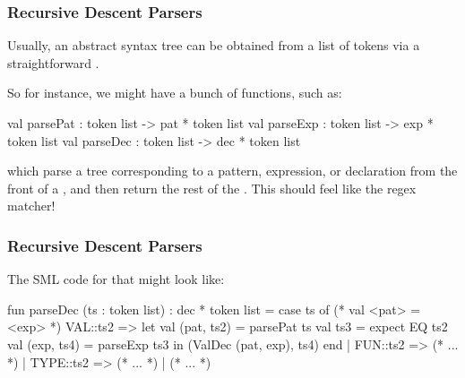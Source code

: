 \documentclass[aspectratio=169, handout]{beamer}
\begin{document}
\begin{frame}[fragile]
  \frametitle{Recursive Descent Parsers}

  \rprs

  Usually, an abstract syntax tree can be obtained from a list of tokens via a
  straightforward .

  \pause
  \vspace{\fill}


  \pause
  \vspace{\fill}

  So for instance, we might have a bunch of functions, such as:
  \begin{codeblock}
    val parsePat : token list -> pat * token list
    val parseExp : token list -> exp * token list
    val parseDec : token list -> dec * token list
  \end{codeblock}

  which parse a tree corresponding to a pattern, expression, or declaration from
  the front of a , and then return the rest of the .
  This should feel like the regex matcher!
\end{frame}

\begin{frame}[fragile]
  \frametitle{Recursive Descent Parsers}

  The SML code for that might look like:

  \pause
  \small
  \begin{codeblock}
    fun parseDec (ts : token list) : dec * token list =
      case ts of
        (* val <pat> = <exp> *)
        VAL::ts2 =>
          let
            val (pat, ts2) = parsePat ts
            val ts3 = expect EQ ts2
            val (exp, ts4) = parseExp ts3
          in
            (ValDec (pat, exp), ts4)
          end
      | FUN::ts2 => (* ... *)
      | TYPE::ts2 => (* ... *)
      | (* ... *)
  \end{codeblock}
\end{frame}
\end{document}
